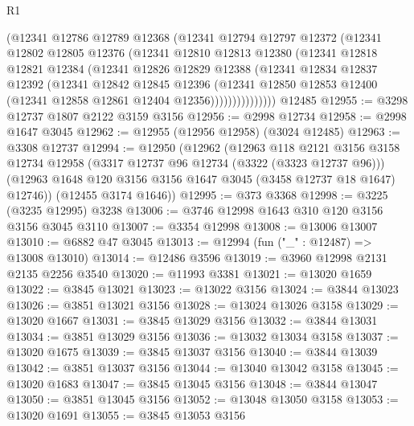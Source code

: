 \begin{lexlean}{R1}
\begin{coremodule}
              (@12341
                @12786
                @12789
                @12368
                (@12341
                  @12794
                  @12797
                  @12372
                  (@12341
                    @12802
                    @12805
                    @12376
                    (@12341
                      @12810
                      @12813
                      @12380
                      (@12341
                        @12818
                        @12821
                        @12384
                        (@12341
                          @12826
                          @12829
                          @12388
                          (@12341
                            @12834
                            @12837
                            @12392
                            (@12341
                              @12842
                              @12845
                              @12396
                              (@12341
                                @12850
                                @12853
                                @12400
                                (@12341 @12858 @12861 @12404 @12356)))))))))))))))
    @12485
@12955 := @3298 @12737 @1807 @2122 @3159 @3156
@12956 := @2998 @12734
@12958 := @2998 @1647 @3045
@12962 := @12955 (@12956 @12958) (@3024 @12485)
@12963 := @3308 @12737
@12994 := @12950
    (@12962
      (@12963
        @118
        @2121
        @3156
        @3158
        @12734
        @12958
        (@3317 @12737 @96 @12734 (@3322 (@3323 @12737 @96)))
        (@12963 @1648 @120 @3156 @3156 @1647 @3045 (@3458 @12737 @18 @1647) @12746))
      (@12455 @3174 @1646))
@12995 := @373 @3368
@12998 := @3225 (@3235 @12995) @3238
@13006 := @3746 @12998 @1643 @310 @120 @3156 @3156 @3045 @3110
@13007 := @3354 @12998
@13008 := @13006 @13007
@13010 := @6882 @47 @3045
@13013 := @12994 (fun ("_" : @12487) => @13008 @13010)
@13014 := @12486 @3596
@13019 := @3960 @12998 @2131 @2135 @2256 @3540
@13020 := @11993 @3381
@13021 := @13020 @1659
@13022 := @3845 @13021
@13023 := @13022 @3156
@13024 := @3844 @13023
@13026 := @3851 @13021 @3156
@13028 := @13024 @13026 @3158
@13029 := @13020 @1667
@13031 := @3845 @13029 @3156
@13032 := @3844 @13031
@13034 := @3851 @13029 @3156
@13036 := @13032 @13034 @3158
@13037 := @13020 @1675
@13039 := @3845 @13037 @3156
@13040 := @3844 @13039
@13042 := @3851 @13037 @3156
@13044 := @13040 @13042 @3158
@13045 := @13020 @1683
@13047 := @3845 @13045 @3156
@13048 := @3844 @13047
@13050 := @3851 @13045 @3156
@13052 := @13048 @13050 @3158
@13053 := @13020 @1691
@13055 := @3845 @13053 @3156

\end{coremodule}
\end{lexlean}
